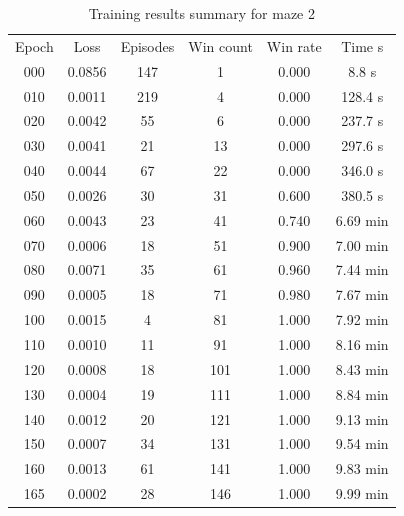 \documentclass[a4paper]{article}    %
\begin{document}
\begin{table}[H]
    \begin{center}
        \begin{tabular}{|c|c|c|c|c|c|}
            \cline{1-6}
            \rowcolor{Gray}
            Epoch & Loss & Episodes & Win count & Win rate & Time s \\
            \cline{1-6}
            000 & 0.0856 & 147 &   1 & 0.000 &   8.8 s  \\
            010 & 0.0011 & 219 &   4 & 0.000 & 128.4 s  \\
            020 & 0.0042 &  55 &   6 & 0.000 & 237.7 s  \\
            030 & 0.0041 &  21 &  13 & 0.000 & 297.6 s  \\
            040 & 0.0044 &  67 &  22 & 0.000 & 346.0 s  \\
            050 & 0.0026 &  30 &  31 & 0.600 & 380.5 s  \\
            060 & 0.0043 &  23 &  41 & 0.740 & 6.69 min \\
            070 & 0.0006 &  18 &  51 & 0.900 & 7.00 min \\
            080 & 0.0071 &  35 &  61 & 0.960 & 7.44 min \\
            090 & 0.0005 &  18 &  71 & 0.980 & 7.67 min \\
            100 & 0.0015 &   4 &  81 & 1.000 & 7.92 min \\
            110 & 0.0010 &  11 &  91 & 1.000 & 8.16 min \\
            120 & 0.0008 &  18 & 101 & 1.000 & 8.43 min \\
            130 & 0.0004 &  19 & 111 & 1.000 & 8.84 min \\
            140 & 0.0012 &  20 & 121 & 1.000 & 9.13 min \\
            150 & 0.0007 &  34 & 131 & 1.000 & 9.54 min \\
            160 & 0.0013 &  61 & 141 & 1.000 & 9.83 min \\
            165 & 0.0002 &  28 & 146 & 1.000 & 9.99 min \\
            \cline{1-6}
        \end{tabular}
    \end{center}
    \caption{Training results summary for maze 2}
    \label{tab:maze2-results}
\end{table}

\end{document}

